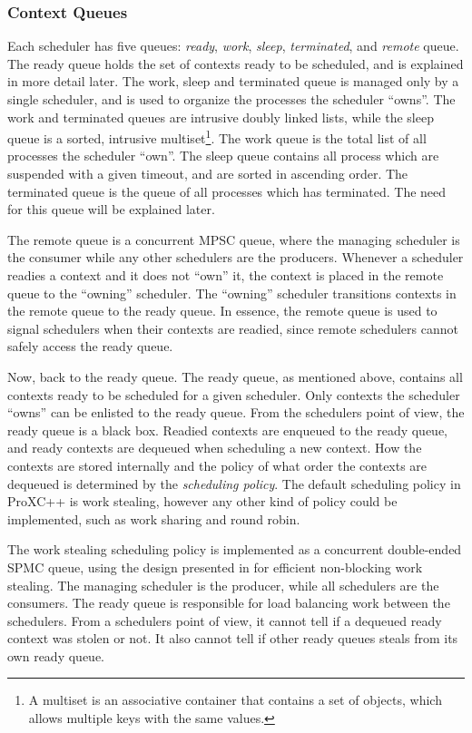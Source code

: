 \FloatBarrier
\subsubsection{Context Queues}

Each scheduler has five queues: \textit{ready}, \textit{work}, \textit{sleep}, \textit{terminated}, and \textit{remote} queue. The ready queue holds the set of contexts ready to be scheduled, and is explained in more detail later. The work, sleep and terminated queue is managed only by a single scheduler, and is used to organize the processes the scheduler ``owns''. The work and terminated queues are intrusive doubly linked lists, while the sleep queue is a sorted, intrusive multiset\footnote{A multiset is an associative container that contains a set of objects, which allows multiple keys with the same values.}. The work queue is the total list of all processes the scheduler ``own''. The sleep queue contains all process which are suspended with a given timeout, and are sorted in ascending order. The terminated queue is the queue of all processes which has terminated. The need for this queue will be explained later. 

The remote queue is a concurrent MPSC queue, where the managing scheduler is the consumer while any other schedulers are the producers. Whenever a scheduler readies a context and it does not ``own'' it, the context is placed in the remote queue to the ``owning'' scheduler. The ``owning'' scheduler transitions contexts in the remote queue to the ready queue. In essence, the remote queue is used to signal schedulers when their contexts are readied, since remote schedulers cannot safely access the ready queue.

Now, back to the ready queue. The ready queue, as mentioned above, contains all contexts ready to be scheduled for a given scheduler. Only contexts the scheduler ``owns'' can be enlisted to the ready queue. From the schedulers point of view, the ready queue is a black box. Readied contexts are enqueued to the ready queue, and ready contexts are dequeued when scheduling a new context. How the contexts are stored internally and the policy of what order the contexts are dequeued is determined by the \textit{scheduling policy}. The default scheduling policy in ProXC++ is work stealing, however any other kind of policy could be implemented, such as work sharing and round robin.

The work stealing scheduling policy is implemented as a concurrent double\hyp{}ended SPMC queue, using the design presented in \citet{chase2005dynamic,le2013correct} for efficient non\hyp{}blocking work stealing. The managing scheduler is the producer, while all schedulers are the consumers. The ready queue is responsible for load balancing work between the schedulers. From a schedulers point of view, it cannot tell if a dequeued ready context was stolen or not. It also cannot tell if other ready queues steals from its own ready queue. 

